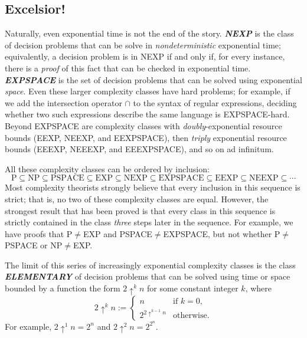 \subsection{Excelsior!}

Naturally, even exponential time is not the end of the story.
\textbf{\textit{NEXP}} is the class of decision problems that can be solve in \textit{nondeterministic} exponential time; equivalently, a decision problem is in NEXP if and only if, for every  instance, there is a \textit{proof} of this fact that can be checked in exponential time.
\textbf{\textit{EXPSPACE}} is the set of decision problems that can be solved using exponential \textit{space}.
Even these larger complexity classes have hard problems; for example, if we add the intersection operator $\cap$ to the syntax of regular expressions, deciding whether two such expressions describe the same language is EXPSPACE-hard.
Beyond EXPSPACE are complexity classes with \textit{doubly}-exponential resource bounds (EEXP, NEEXP, and EEXPSPACE), then \textit{triply} exponential resource bounds (EEEXP, NEEEXP, and EEEXPSPACE), and so on ad infinitum.

All these complexity classes can be ordered by inclusion:
\[
\text{P} \subseteq \text{NP} \subseteq \text{PSPACE} \subseteq \text{EXP} \subseteq \text{NEXP} \subseteq \text{EXPSPACE} \subseteq \text{EEXP} \subseteq \text{NEEXP} \subseteq \cdots
\]
Most complexity theorists strongly believe that every inclusion in this sequence is strict; that is, no two of these complexity classes are equal.
However, the strongest result that has been proved is that every class in this sequence is strictly contained in the class \textit{three} steps later in the sequence.
For example, we have proofs that P${}\neq{}$EXP and PSPACE${}\neq{}$EXPSPACE, but not whether P${}\neq{}$PSPACE or NP${}\neq{}$EXP.

The limit of this series of increasingly exponential complexity classes is the class \textbf{\textit{ELEMENTARY}} of decision problems that can be solved using time or space bounded by a function the form $2 \uparrow^k n$ for some constant integer $k$, where
\[
2 \uparrow^k n := \begin{cases}
n & \text{if } k = 0,\\
2^{2\uparrow^{k-1}n} & \text{otherwise.}
\end{cases}
\]
For example, $2 \uparrow^1 n = 2^n$ and $2 \uparrow^2 n = 2^{2^n}$.

